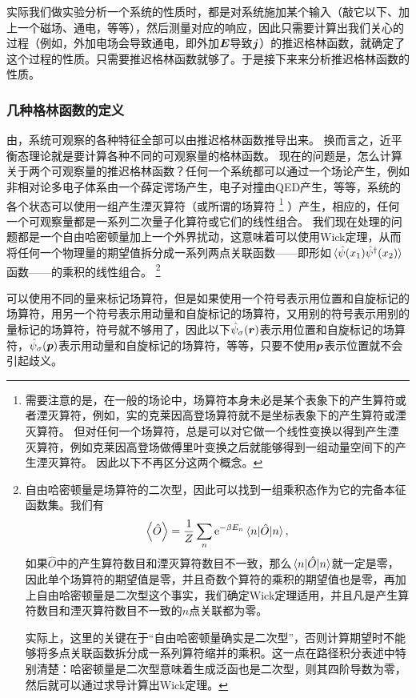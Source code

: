 \documentclass[hyperref, UTF8, a4paper]{ctexart}
\newcommand*{\ee}{\mathrm{e}}
\renewcommand{\autoref}{\prettyref}
\begin{document}
实际我们做实验分析一个系统的性质时，都是对系统施加某个输入（敲它以下、加上一个磁场、通电，等等），然后测量对应的响应，因此只需要计算出我们关心的过程（例如，外加电场会导致通电，即外加$\vb*{E}$导致$\vb*{j}$）的推迟格林函数，就确定了这个过程的性质。只需要推迟格林函数就够了。于是接下来来分析推迟格林函数的性质。

\subsubsection{几种格林函数的定义}

由\autoref{sec:linear-response}，系统可观察的各种特征全部可以由推迟格林函数推导出来。
换而言之，近平衡态理论就是要计算各种不同的可观察量的格林函数。
现在的问题是，怎么计算关于两个可观察量的推迟格林函数？任何一个系统都可以通过一个场论产生，例如非相对论多电子体系由一个薛定谔场产生，电子对撞由QED产生，等等，系统的各个状态可以使用一组产生湮灭算符（或所谓的场算符%
\footnote{
    需要注意的是，在一般的场论中，场算符本身未必是某个表象下的产生算符或者湮灭算符，例如，实的克莱因高登场算符就不是坐标表象下的产生算符或湮灭算符。
    但对任何一个场算符，总是可以对它做一个线性变换以得到产生湮灭算符，例如克莱因高登场做傅里叶变换之后就能够得到一组动量空间下的产生湮灭算符。
    因此以下不再区分这两个概念。
}%
）产生，相应的，任何一个可观察量都是一系列二次量子化算符或它们的线性组合。
我们现在处理的问题都是一个自由哈密顿量加上一个外界扰动，这意味着可以使用Wick定理，从而将任何一个物理量的期望值拆分成一系列两点关联函数——即形如$\expval*{\hat{\psi}(x_1)\hat{\psi}^\dagger(x_2)}$函数——的乘积的线性组合。%
\footnote{自由哈密顿量是场算符的二次型，因此可以找到一组乘积态作为它的完备本征函数集。我们有
\[
    \expval{\hat{O}} = \frac{1}{Z} \sum_n \ee^{-\beta E_n} \mel{n}{\hat{O}}{n},
\]
如果$\hat{O}$中的产生算符数目和湮灭算符数目不一致，那么$\mel{n}{\hat{O}}{n}$就一定是零，因此单个场算符的期望值是零，并且奇数个算符的乘积的期望值也是零，再加上自由哈密顿量是二次型这个事实，我们确定Wick定理适用，并且凡是产生算符数目和湮灭算符数目不一致的$n$点关联都为零。

实际上，这里的关键在于“自由哈密顿量确实是二次型”，否则计算期望时不能够将多点关联函数拆分成一系列算符缩并的乘积。这一点在路径积分表述中特别清楚：哈密顿量是二次型意味着生成泛函也是二次型，则其四阶导数为零，然后就可以通过求导计算出Wick定理。
}%

可以使用不同的量来标记场算符，但是如果使用一个符号表示用位置和自旋标记的场算符，用另一个符号表示用动量和自旋标记的场算符，又用别的符号表示用别的量标记的场算符，符号就不够用了，因此以下$\hat{\psi}_\sigma(\vb*{r})$表示用位置和自旋标记的场算符，$\hat{\psi}_\sigma(\vb*{p})$表示用动量和自旋标记的场算符，等等，只要不使用$\vb*{p}$表示位置就不会引起歧义。
\end{document}
